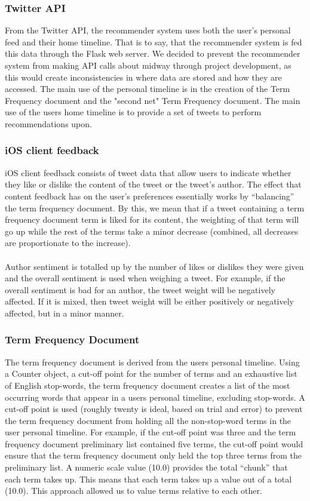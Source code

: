 \documentclass{article}
\begin{document}
\subsubsection*{Twitter API} %
From the Twitter API, the recommender system uses both the user's personal feed and their home timeline. That is to say, that the recommender system is fed this data through the Flask web server. We decided to prevent the recommender system from making API calls about midway through project development, as this would create inconsistencies in where data are stored and how they are accessed. The main use of the personal timeline is in the creation of the Term Frequency document and the "second net" Term Frequency document. The main use of the users home timeline is to provide a set of tweets to perform recommendations upon.

\subsubsection*{iOS client feedback} %
iOS client feedback consists of tweet data that allow users to indicate whether they like or dislike the content of the tweet or the tweet's author. The effect that content feedback has on the user's preferences essentially works by “balancing” the term frequency document. By this, we mean that if a tweet containing a term frequency document term is liked for its content, the weighting of that term will go up while the rest of the terms take a minor decrease (combined, all decreases are proportionate to the increase). 
\\\\
Author sentiment is totalled up by the number of likes or dislikes they were given and the overall sentiment is used when weighing a tweet. For example, if the overall sentiment is bad for an author, the tweet weight will be negatively affected. If it is mixed, then tweet weight will be either positively or negatively affected, but in a minor manner.

\subsubsection*{Term Frequency Document} %
The term frequency document is derived from the users personal timeline. Using a Counter object, a cut-off point for the number of terms and an exhaustive list of English stop-words, the term frequency document creates a list of the most occurring words that appear in a users personal timeline, excluding stop-words. A cut-off point is used (roughly twenty is ideal, based on trial and error) to prevent the term frequency document from holding all the non-stop-word terms in the user personal timeline. For example, if the cut-off point was three and the term frequency document preliminary list contained five terms, the cut-off point would ensure that the term frequency document only held the top three terms from the preliminary list. A numeric scale value (10.0) provides the total “chunk” that each term takes up. This means that each term takes up a value out of a total (10.0). This approach allowed us to value terms relative to each other.
\end{document}
